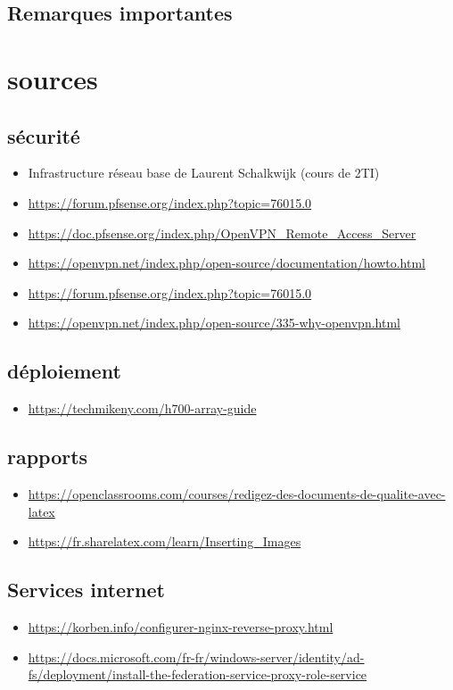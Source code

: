 \documentclass{article}
\begin{document}
    \subsection{Remarques importantes}

\section{sources}
    \subsection{sécurité}
    \begin{itemize}
        \item Infrastructure réseau base de Laurent Schalkwijk (cours de 2TI)
        \item \url{https://forum.pfsense.org/index.php?topic=76015.0}
        \item \url{https://doc.pfsense.org/index.php/OpenVPN_Remote_Access_Server}
        \item \url{https://openvpn.net/index.php/open-source/documentation/howto.html}
        \item \url{https://forum.pfsense.org/index.php?topic=76015.0}
        \item \url{https://openvpn.net/index.php/open-source/335-why-openvpn.html}
    \end{itemize}
    \subsection{déploiement}
    \begin{itemize}
        \item \url{https://techmikeny.com/h700-array-guide}
    \end{itemize}
    
    \subsection{rapports}
        \begin{itemize}
            \item \url{https://openclassrooms.com/courses/redigez-des-documents-de-qualite-avec-latex}
            \item \url{https://fr.sharelatex.com/learn/Inserting\_Images}
        \end{itemize}

    \subsection{Services internet}
    \begin{itemize}
        \item \url{https://korben.info/configurer-nginx-reverse-proxy.html}
        \item \url{https://docs.microsoft.com/fr-fr/windows-server/identity/ad-fs/deployment/install-the-federation-service-proxy-role-service}
    \end{itemize}
\end{document}
